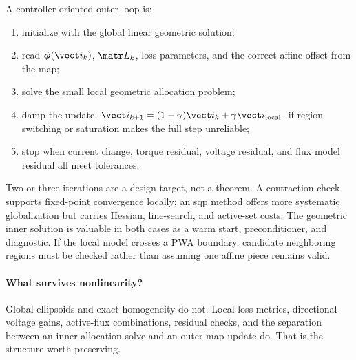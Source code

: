 A controller-oriented outer loop is:
\begin{enumerate}
 \item initialize with the global linear geometric solution;
 \item read \(\boldsymbol\phi(\vect i_k)\), \(\matr L_k\), loss parameters,
       and the correct affine offset from the map;
 \item solve the small local geometric allocation problem;
 \item damp the update,
       \(\vect i_{k+1}=(1-\gamma)\vect i_k+\gamma\vect i_{\mathrm{local}}\),
       if region switching or saturation makes the full step unreliable;
 \item stop when current change, torque residual, voltage residual, and flux
       model residual all meet tolerances.
\end{enumerate}
Two or three iterations are a design target, not a theorem. A contraction
check supports fixed-point convergence locally; an \gls{sqp} method offers
more systematic globalization but carries Hessian, line-search, and active-set
costs. The geometric inner solution is valuable in both cases as a warm start,
preconditioner, and diagnostic. If the local model crosses a PWA boundary,
candidate neighboring regions must be checked rather than assuming one affine
piece remains valid.

\paragraph{What survives nonlinearity?}
Global ellipsoids and exact homogeneity do not. Local loss metrics, directional
voltage gains, active-flux combinations, residual checks, and the separation
between an inner allocation solve and an outer map update do. That is the
structure worth preserving.

